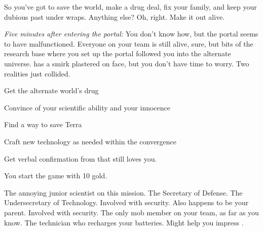 \documentclass[char]{guildcamp3}
\begin{document}
So you've got to save the world, make a drug deal, fix your family, and keep your dubious past under wraps. Anything else? Oh, right. Make it out alive.

\emph{Five minutes after entering the portal:}
You don't know how, but the portal seems to have malfunctioned. Everyone on your team is still alive, sure, but bits of the research base where you set up the portal followed you into the alternate universe. \cSciOne{} has a smirk plastered on \cSciOne{\their} face, but you don't have time to worry. Two realities just collided.

\begin{itemz}[Goals]
  \item Get the alternate world's drug
  \item Convince \cSciTwo{} of your scientific ability and your innocence
  \item Find a way to save Terra
  \item Craft new technology as needed within the convergence
  \item Get verbal confirmation from \cSpecOpOne{} that \cSpecOpOne{\they} still loves you.
\end{itemz}

\begin{itemz}[Notes]
	\item You start the game with 10 gold. 
\end{itemz}

\begin{contacts}
  \contact{\cSciTwo{}} The annoying junior scientist on this mission.
  \contact{\cPoliOne{}} The Secretary of Defense.
  \contact{\cPoliTwo{}} The Undersecretary of Technology.
  \contact{\cSpecOpOne{}} Involved with security. Also happens to be your parent.
  \contact{\cSpecOpTwo{}} Involved with security. The only mob member on your team, as far as you know.
  \contact{\cTech{}} The technician who recharges your batteries. Might help you impress \cSciTwo{}.
\end{contacts}
\end{document}
